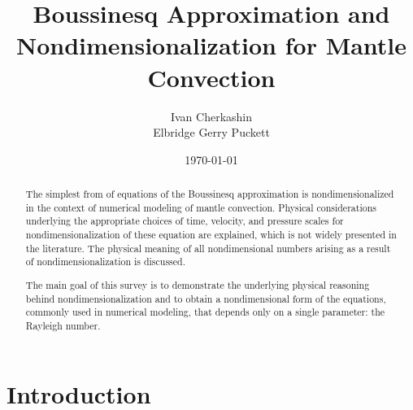 \documentclass[
12pt, %
a4paper, %
oneside, %
headinclude,footinclude, %
BCOR5mm, %
]{scrartcl}
\begin{document}
\title{Boussinesq Approximation and Nondimensionalization for Mantle Convection}


\author{Ivan Cherkashin \\ Elbridge Gerry Puckett}




\date{\today}

\maketitle

\begin{abstract}
The simplest from of equations of the Boussinesq approximation is nondimensionalized in the context of numerical modeling of mantle convection. Physical considerations underlying the appropriate choices of time, velocity, and pressure scales for nondimensionalization of these equation are explained, which is not widely presented in the literature. The physical meaning of all nondimensional numbers arising as a result of nondimensionalization is discussed. 

The main goal of this survey is to demonstrate the underlying physical reasoning behind nondimensionalization and to obtain a nondimensional form of the equations, commonly used in numerical modeling, that depends only on a single parameter: the Rayleigh number.
\end{abstract}

\tableofcontents

\section*{Introduction}
\end{document}
